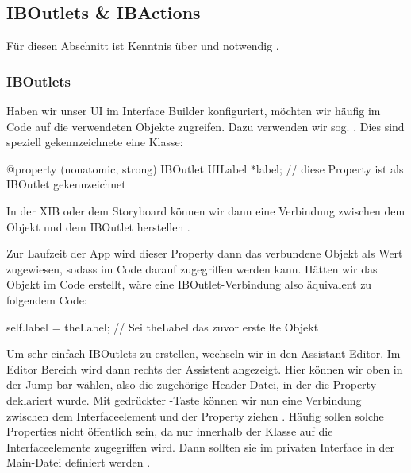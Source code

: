 \documentclass[parskip=half, final]{scrreprt}
\begin{document}
\subsection{IBOutlets \& IBActions}\label{sec:iboutletsibactions}

 Für diesen Abschnitt ist Kenntnis über   und   notwendig .

\subsubsection{IBOutlets}

Haben wir unser UI im Interface Builder konfiguriert, möchten wir häufig im Code auf die verwendeten Objekte zugreifen. Dazu verwenden wir sog. . Dies sind speziell gekennzeichnete  eine Klasse:
\begin{objclst}
@property (nonatomic, strong) IBOutlet UILabel *label; // diese Property ist als IBOutlet gekennzeichnet
\end{objclst}

In der XIB oder dem Storyboard können wir dann eine Verbindung zwischen dem Objekt und dem IBOutlet herstellen .


Zur Laufzeit der App wird dieser Property dann das verbundene Objekt als Wert zugewiesen, sodass im Code darauf zugegriffen werden kann. Hätten wir das Objekt im Code erstellt, wäre eine IBOutlet-Verbindung also äquivalent zu folgendem Code:
\begin{objclst}
self.label = theLabel; // Sei theLabel das zuvor erstellte Objekt
\end{objclst}

Um sehr einfach IBOutlets zu erstellen, wechseln wir in den Assistant-Editor. Im Editor Bereich wird dann rechts der Assistent angezeigt. Hier können wir oben in der Jump bar  wählen, also die zugehörige Header-Datei, in der die Property deklariert wurde. Mit gedrückter \keysc{\ctrlkey}-Taste können wir nun eine Verbindung zwischen dem Interfaceelement und der Property ziehen . Häufig sollen solche Properties nicht öffentlich sein, da nur innerhalb der Klasse auf die Interfaceelemente zugegriffen wird. Dann sollten sie im privaten Interface in der Main-Datei definiert werden .
\end{document}
